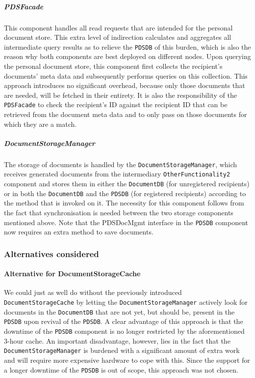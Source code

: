 \documentclass[a4paper,10pt]{article}
\begin{document}
\subparagraph{PDSFacade}
This component handles all read requests that are intended for the personal document store. This extra level of indirection calculates and aggregates all intermediate query results as to relieve the \texttt{PDSDB} of this burden, which is also the reason why both components are best deployed on different nodes. Upon querying the personal document store, this component first collects the recipient's documents' meta data and subsequently performs queries on this collection. This approach introduces no significant overhead, because only those documents that are needed, will be fetched in their entirety. It is also the responsibility of the \texttt{PDSFacade} to check the recipient's ID against the recipient ID that can be retrieved from the document meta data and to only pass on those documents for which they are a match.

\subparagraph{DocumentStorageManager}
The storage of documents is handled by the \texttt{DocumentStorageManager}, which receives generated documents from the intermediary \texttt{OtherFunctionality2} component and stores them in either the \texttt{DocumentDB} (for unregistered recipients) or in both the \texttt{DocumentDB} and the \texttt{PDSDB} (for registered recipients) according to the method that is invoked on it. The necessity for this component follows from the fact that synchronisation is needed between the two storage components mentioned above. Note that the PDSDocMgmt interface in the \texttt{PDSDB} component now requires an extra method to save documents.

\subsubsection*{Alternatives considered}

\paragraph{Alternative for DocumentStorageCache}
We could just as well do without the previously introduced \texttt{DocumentStorageCache} by letting the \texttt{DocumentStorageManager} actively look for documents in the \texttt{DocumentDB} that are not yet, but should be, present in the \texttt{PDSDB} upon revival of the \texttt{PDSDB}. A clear advantage of this approach is that the downtime of the \texttt{PDSDB} component is no longer restricted by the aforementioned 3-hour cache. An important disadvantage, however, lies in the fact that the \texttt{DocumentStorageManager} is burdened with a significant amount of extra work and will require more expensive hardware to cope with this. Since the support for a longer downtime of the \texttt{PDSDB} is out of scope, this approach was not chosen.
\end{document}
